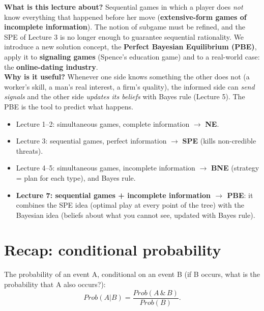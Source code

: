 \documentclass[11pt,a4paper,openany]{book}
\begin{document}
\begin{rembox}[title=In a nutshell]
\textbf{What is this lecture about?} Sequential games in which a player does \emph{not} know
everything that happened before her move (\textbf{extensive-form games of incomplete
information}). The notion of subgame must be refined, and the SPE of Lecture 3 is no longer
enough to guarantee sequential rationality. We introduce a new solution concept, the
\textbf{Perfect Bayesian Equilibrium (PBE)}, apply it to \textbf{signaling games} (Spence's
education game) and to a real-world case: the \textbf{online-dating industry}. \\
\textbf{Why is it useful?} Whenever one side knows something the other does not (a worker's
skill, a man's real interest, a firm's quality), the informed side can \emph{send signals}
and the other side \emph{updates its beliefs} with Bayes rule (Lecture 5). The PBE is the tool
to predict what happens.
\end{rembox}

\begin{rembox}[title=Where we are in the course]
\begin{itemize}
  \item Lecture 1--2: simultaneous games, complete information $\to$ \textbf{NE}.
  \item Lecture 3: sequential games, perfect information $\to$ \textbf{SPE} (kills
        non-credible threats).
  \item Lecture 4--5: simultaneous games, incomplete information $\to$ \textbf{BNE}
        (strategy = plan for each type), and Bayes rule.
  \item \textbf{Lecture 7: sequential games + incomplete information $\to$ PBE}: it combines
        the SPE idea (optimal play at every point of the tree) with the Bayesian idea
        (beliefs about what you cannot see, updated with Bayes rule).
\end{itemize}
\end{rembox}


\section{Recap: conditional probability}

\begin{defnbox}[title=Bayes formula]
The probability of an event A, conditional on an event B (if B occurs, what is the
probability that A also occurs?):
\[
Prob(A|B) = \frac{Prob(A \,\&\, B)}{Prob(B)}.
\]
\end{defnbox}
\end{document}
